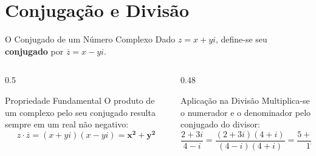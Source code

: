 \documentclass[10pt, aspectratio=169]{beamer}
\begin{document}
\section{Conjugação e Divisão}

\begin{frame}{O Conjugado de um Número Complexo}
  Dado $z = x + yi$, define-se seu \textbf{conjugado} por $\overline{z} = x - yi$.

  \begin{columns}
    \begin{column}{0.5\textwidth}
      \begin{alertblock}{Propriedade Fundamental}
        O produto de um complexo pelo seu conjugado resulta sempre em um real não negativo:
        \[
        z \cdot \overline{z} = (x + yi)(x - yi) = \mathbf{x^2 + y^2}
        \]
      \end{alertblock}
    \end{column}
    
    \begin{column}{0.48\textwidth}
      \begin{block}{Aplicação na Divisão}
        Multiplica-se o numerador e o denominador pelo conjugado do divisor:
        \[
        \frac{2 + 3i}{4 - i} = \frac{(2 + 3i)(4 + i)}{(4 - i)(4 + i)} = \frac{5 + 14i}{17}
        \]
      \end{block}
    \end{column}
  \end{columns}
\end{frame}
\end{document}
